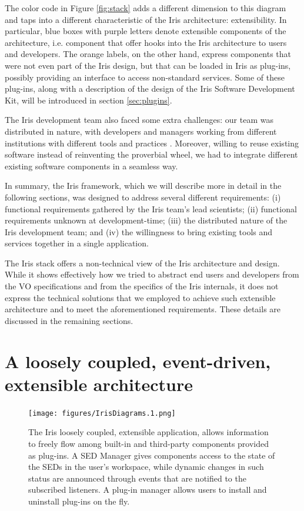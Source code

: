 \documentclass[5p]{elsarticle}
\begin{document}
The color code in Figure \ref{fig:stack} adds a different dimension to this diagram and taps into a different characteristic of the Iris architecture: extensibility. In particular, blue boxes with purple letters denote extensible components of the architecture, i.e. component that offer hooks into the Iris architecture to users and developers. The orange labels, on the other hand, express components that were not even part of the Iris design, but that can be loaded in Iris as plug-ins, possibly providing an interface to access non-standard services. Some of these plug-ins, along with a description of the design of the Iris Software Development Kit, will be introduced in section \ref{sec:plugins}.

The Iris development team also faced some extra challenges: our team was distributed in nature, with developers and managers working from different institutions with different tools and practices \citep{2012SPIE.8449E..0IE}. Moreover, willing to reuse existing software instead of reinventing the proverbial wheel, we had to integrate different existing software components in a seamless way.

In summary, the Iris framework, which we will describe more in detail in the following sections, was designed to address several different requirements: (i) functional requirements gathered by the Iris team's lead scientists; (ii) functional requirements unknown at development-time; (iii) the distributed nature of the Iris development team; and (iv) the willingness to bring existing tools and services together in a single application.

The Iris stack offers a non-technical view of the Iris architecture and design. While it shows effectively how we tried to abstract end users and developers from the VO specifications and from the specifics of the Iris internals, it does not express the technical solutions that we employed to achieve such extensible architecture and to meet the aforementioned requirements. These details are discussed in the remaining sections.



\section{A loosely coupled, event-driven, extensible architecture}
\label{sec:architecture}

\begin{figure}
\begin{center}
\texttt{[image: figures/IrisDiagrams.1.png]}
\caption{The Iris loosely coupled, extensible application, allows information to freely flow among built-in and third-party components provided as plug-ins. A SED Manager gives components access to the state of the SEDs in the user's workspace, while dynamic changes in such status are announced through events that are notified to the subscribed listeners. A plug-in manager allows users to install and uninstall plug-ins on the fly.}
\end{center}
\end{figure}
\end{document}
